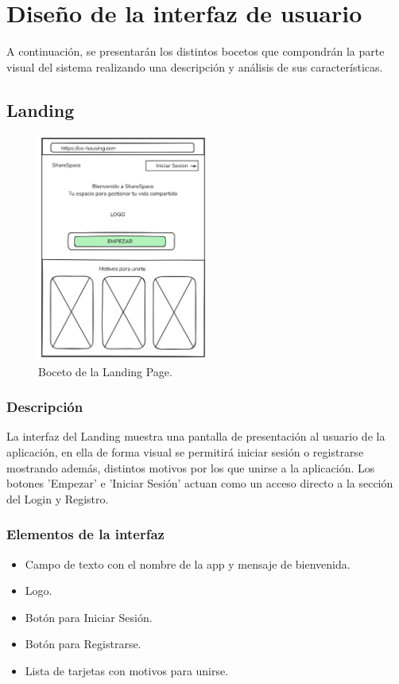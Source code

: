 \newpage

\section{Diseño de la interfaz de usuario}
A continuación, se presentarán los distintos bocetos que compondrán la parte visual del sistema realizando una descripción y análisis de sus características.

\subsection{Landing}
\begin{figure}[H]
    \centering
    \includegraphics[width=0.5\textwidth]{fotos/Landing-boceto.png}
    \caption{Boceto de la Landing Page.}
    \label{fig:landing-boceto}
\end{figure}
\subsubsection{Descripción}
La interfaz del Landing muestra una pantalla de presentación al usuario de la aplicación, en ella de forma visual se permitirá iniciar sesión o registrarse mostrando además, distintos motivos por los que unirse a la aplicación. Los botones 'Empezar' e 'Iniciar Sesión' actuan como un acceso directo a la sección del Login y Registro.

\subsubsection{Elementos de la interfaz}
\begin{itemize}
  \item Campo de texto con el nombre de la app y mensaje de bienvenida.
  \item Logo.
  \item Botón para Iniciar Sesión.
  \item Botón para Registrarse.
  \item Lista de tarjetas con motivos para unirse.
\end{itemize}


